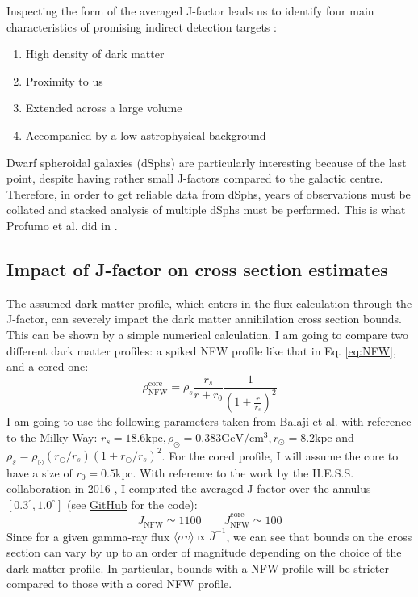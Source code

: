 Inspecting the form of the averaged J-factor leads us to identify four main characteristics of promising indirect detection targets \cite{Hooper_2018}:
\begin{enumerate}
	\item High density of dark matter
	\item Proximity to us
	\item Extended across a large volume
	\item Accompanied by a low astrophysical background
\end{enumerate}
Dwarf spheroidal galaxies (dSphs) are particularly interesting because of the last point, despite having rather small J-factors compared to the galactic centre. Therefore, in order to get reliable data from dSphs, years of observations must be collated and stacked analysis of multiple dSphs must be performed. This is what Profumo et al. did in \cite{Profumo_2018}.

\subsection{Impact of J-factor on cross section estimates}
The assumed dark matter profile, which enters in the flux calculation through the J-factor, can severely impact the dark matter annihilation cross section bounds. This can be shown by a simple numerical calculation. I am going to compare two different dark matter profiles: a spiked NFW profile like that in Eq. \eqref{eq:NFW}, and a cored one:
\begin{equation}
	\rho_{\text{NFW}}^{\text{core} } = \rho _s \frac{r_s}{r+ r_0} \frac{1}{\left( 1 + \frac{r}{r_s} \right) ^2}
\end{equation}
I am going to use the following parameters taken from Balaji et al. \cite{Balaji_2023} with reference to the Milky Way: \(r_s = 18.6 \mathrm{kpc}, \rho_\odot = 0.383 \mathrm{GeV / cm^3}, r_\odot = 8.2 \mathrm{kpc}  \) and \(\rho _s = \rho _\odot (r_\odot / r_s) (1 + r_\odot / r_s)^2\). For the cored profile, I will assume the core to have a size of \(r_0 = 0.5 \mathrm{kpc} \). With reference to the work by the H.E.S.S. collaboration in 2016 \cite{Abdallah_2016}, I computed the averaged J-factor over the annulus \([0.3^\circ, 1.0^\circ]\) (see \href{https://github.com/LuckeeDev/bachelor-thesis}{GitHub} for the code):
\begin{equation}
	\overline{J}_{\text{NFW} } \simeq 1100
	\qquad
	\overline{J}_{\text{NFW} }^{\text{core} } \simeq 100   
\end{equation}
Since for a given gamma-ray flux \(\langle \sigma v \rangle \propto \overline{J}^{-1} \), we can see that bounds on the cross section can vary by up to an order of magnitude depending on the choice of the dark matter profile. In particular, bounds with a NFW profile will be stricter compared to those with a cored NFW profile.

